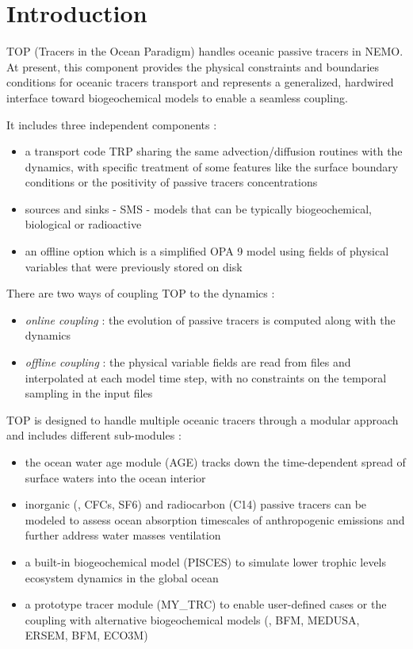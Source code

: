 
\chapter*{Introduction}

TOP (Tracers in the Ocean Paradigm) handles oceanic passive tracers in NEMO. At present, this component provides the physical constraints and boundaries conditions for oceanic tracers transport and represents a generalized, hardwired interface toward biogeochemical models to enable a seamless coupling.

It includes three independent components :

\begin{itemize}
        \item a transport code TRP sharing the same advection/diffusion routines with the dynamics, with specific treatment of some features like the surface boundary
conditions or the positivity of passive tracers concentrations
        \item sources and sinks - SMS - models that can be typically biogeochemical, biological or radioactive
        \item an offline option which is a simplified OPA 9 model using fields of physical variables that were previously stored on disk
\end{itemize}

There are two ways of coupling TOP to the dynamics :

\begin{itemize}
        \item \textit{online coupling} : the evolution of passive tracers is computed along with the dynamics
        \item \textit{offline coupling} : the physical variable fields are read from files and interpolated at each model time step, with no constraints on the temporal sampling in the input files
\end{itemize}

TOP is designed to handle multiple oceanic tracers through a modular approach and includes different sub-modules :

\begin{itemize}
        \item the ocean water age module (AGE) tracks down the time-dependent spread of surface waters into the ocean interior
        \item inorganic (\eg, CFCs, SF6) and radiocarbon (C14) passive tracers can be modeled to assess ocean absorption timescales of anthropogenic emissions and further address water masses ventilation
        \item a built-in biogeochemical model (PISCES) to simulate lower trophic levels ecosystem dynamics in the global ocean
        \item a prototype tracer module (MY\_TRC) to enable user-defined cases or the coupling with alternative biogeochemical models (\eg, BFM, MEDUSA, ERSEM, BFM, ECO3M)
\end{itemize}

